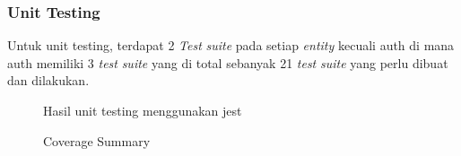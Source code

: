 \subsubsection{Unit Testing}
Untuk unit testing, terdapat 2 \textit{Test} \textit{suite} pada setiap \textit{entity} kecuali auth di mana auth memiliki 3 \textit{test} \textit{suite} yang di total sebanyak 21 \textit{test} \textit{suite} yang perlu dibuat dan dilakukan.

\begin{figure}[h]
  {\par}
  \caption{Hasil unit testing menggunakan jest}
  \label{unit-testing}
\end{figure}

\begin{figure}[h]
  {\par}
  \caption{Coverage Summary}
  \label{coverage-summary}
\end{figure}

